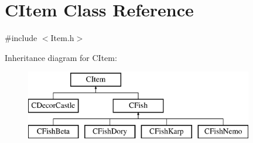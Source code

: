 \hypertarget{class_c_item}{}\section{C\+Item Class Reference}
\label{class_c_item}


{\ttfamily \#include $<$Item.\+h$>$}

Inheritance diagram for C\+Item\+:\begin{figure}[H]
\begin{center}
\leavevmode
\includegraphics[height=3.000000cm]{class_c_item}
\end{center}
\end{figure}
